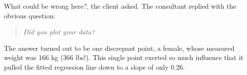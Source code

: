 \documentclass[
  letterpaper,
  10pt,
  krantz2]{krantz}
\makeatletter
\newenvironment{Shaded}{\begin{snugshade}}{\end{snugshade}}
\newcommand{\AttributeTok}[1]{\textcolor[rgb]{0.40,0.45,0.13}{#1}}
\newcommand{\ConstantTok}[1]{\textcolor[rgb]{0.56,0.35,0.01}{#1}}
\newcommand{\DecValTok}[1]{\textcolor[rgb]{0.68,0.00,0.00}{#1}}
\newcommand{\FunctionTok}[1]{\textcolor[rgb]{0.28,0.35,0.67}{#1}}
\newcommand{\NormalTok}[1]{\textcolor[rgb]{0.00,0.23,0.31}{#1}}
\newcommand{\SpecialCharTok}[1]{\textcolor[rgb]{0.37,0.37,0.37}{#1}}
\newcommand{\StringTok}[1]{\textcolor[rgb]{0.13,0.47,0.30}{#1}}
\newenvironment{kframe}{%
  \medskip{}
  \setlength{\fboxsep}{.8em}
  \def\at@end@of@kframe{}%
  \ifinner\ifhmode%
  \def\at@end@of@kframe{\end{minipage}}%
  \begin{minipage}{\columnwidth}%
  \fi\fi%
  \def\FrameCommand##1{\hskip\@totalleftmargin \hskip-\fboxsep
  \colorbox{shadecolor}{##1}\hskip-\fboxsep
      \hskip-\linewidth \hskip-\@totalleftmargin \hskip\columnwidth}%
  \MakeFramed {\advance\hsize-\width
    \@totalleftmargin\z@ \linewidth\hsize
    \@setminipage}}%
{\par\unskip\endMakeFramed%
  \at@end@of@kframe}
\renewenvironment{Shaded}{\begin{kframe}}{\end{kframe}}
\makeatother
\begin{document}
What could be wrong here?, the client asked. The consultant replied with
the obvious question:

\begin{quote}
\emph{Did you plot your data?}
\end{quote}

The answer turned out to be one discrepant point, a female, whose
measured weight was 166 kg (366 lbs!). This single point exerted so much
influence that it pulled the fitted regression line down to a slope of
only 0.26.

\begin{Shaded}
\end{Shaded}
\end{document}
